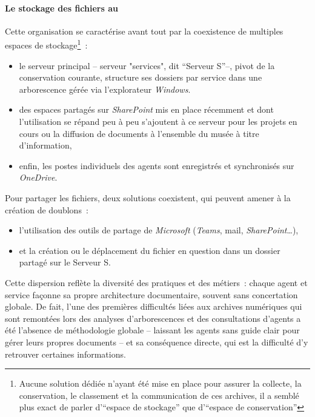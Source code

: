 \paragraph*{Le stockage des fichiers au \mae}
Cette organisation se caractérise avant tout par la coexistence de multiples espaces de stockage\footnote{Aucune solution dédiée n'ayant été mise en place pour assurer la collecte, la conservation, le classement et la communication de ces archives, il a semblé plus exact de parler d'\enquote{espace de stockage} que d'\enquote{espace de conservation}}~:

\begin{itemize}
	\item le serveur principal -- serveur "services", dit \enquote{Serveur S}--, pivot de la conservation courante, structure ses dossiers par service dans une arborescence gérée via l’explorateur \textit{Windows}. 
	\item des espaces partagés sur \textit{SharePoint} mis en place récemment et dont l'utilisation se répand peu à peu s'ajoutent à ce serveur pour les projets en cours ou la diffusion de documents à l'ensemble du musée à titre d'information,
	\item enfin, les postes individuels des agents sont enregistrés et synchronisés sur \textit{OneDrive}.
\end{itemize}

Pour partager les fichiers, deux solutions coexistent, qui peuvent amener à la création de doublons~:

\begin{itemize}
	\item l'utilisation des outils de partage de \textit{Microsoft} (\textit{Teams}, mail, \textit{SharePoint}\dots),
	\item et la création ou le déplacement du fichier en question dans un dossier partagé sur le Serveur S.
	
\end{itemize}

Cette dispersion reflète la diversité des pratiques et des métiers~: chaque agent et service façonne sa propre architecture documentaire, souvent sans concertation globale. De fait, l'une des premières difficultés liées aux archives numériques qui sont remontées lors des analyses d'arborescences et des consultations d'agents a été l'absence de méthodologie globale -- laissant les agents sans guide clair pour gérer leurs propres documents -- et sa conséquence directe, qui est la difficulté d'y retrouver certaines informations.

